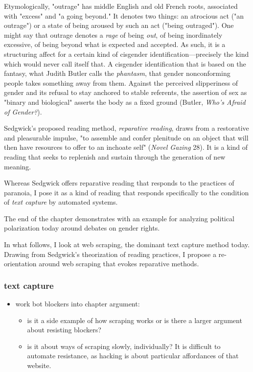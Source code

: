 \documentclass[11pt]{article}
\begin{document}
Etymologically, "outrage" has middle English and old French roots,
associated with "excess" and "a going beyond." It denotes two things:
an atrocious act ("an outrage") or a state of being aroused by such an
act ("being outraged"). One might say that outrage denotes a \emph{rage} of
being \emph{out}, of being inordinately excessive, of being beyond what is
expected and accepted. As such, it is a structuring affect for a
certain kind of cisgender identification---precisely the kind which
would never call itself that. A cisgender identification that is based
on the fantasy, what Judith Butler calls the \emph{phantasm}, that gender
nonconforming people takes something away from them. Against the
perceived slipperiness of gender and its refusal to stay anchored to
stable referents, the assertion of sex as "binary and biological"
asserts the body as a fixed ground (Butler, \emph{Who's Afraid of
Gender?}).

Sedgwick's proposed reading method, \emph{reparative reading}, draws from a
restorative and pleasurable impulse, "to assemble and confer plenitude
on an object that will then have resources to offer to an inchoate
self" (\emph{Novel Gazing} 28). It is a kind of reading that seeks to
replenish and sustain through the generation of new meaning.

Whereas Sedgwick offers reparative reading that responds to the
practices of paranoia, I pose it as a kind of reading that responds
specifically to the condition of \emph{text capture} by automated systems.

The end of the chapter demonstrates with an example for analyzing
political polarization today around debates on gender rights.

In what follows, I look at web scraping, the dominant text capture
method today. Drawing from Sedgwick's theorization of reading
practices, I propose a re-orientation around web scraping that evokes
reparative methods. 

\subsubsection{text capture}
\label{sec:org6d1cfeb}
\begin{itemize}
\item[{$\square$}] work bot blockers into chapter argument:
\begin{itemize}
\item is it a side example of how scraping works or is there a larger
argument about resisting blockers?
\item is it about ways of scraping slowly, individually? It is difficult
to automate resistance, as hacking is about particular affordances
of that website.
\end{itemize}
\end{itemize}
\end{document}

